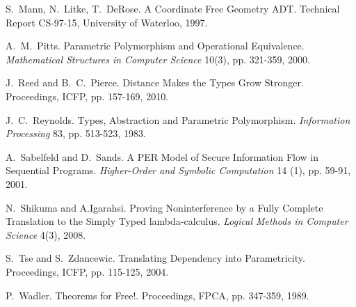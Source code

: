 \documentclass{sigplanconf}
\theoremstyle{examplestyle}
\theoremstyle{restatementstyle}
\begin{document}
\begin{thebibliography}{12}
S.~Mann, N.~Litke, T.~DeRose.  A Coordinate Free Geometry {ADT}.
Technical Report CS-97-15, University of Waterloo, 1997.

A.~M.~Pitts.  Parametric Polymorphism and Operational Equivalence.
{\em Mathematical Structures in Computer Science} 10(3), pp. 321-359,
2000.

J.~Reed and B.~C.~Pierce.  Distance Makes the Types Grow Stronger.
Proceedings, ICFP, pp. 157-169, 2010.

J.~C.~Reynolds. Types, Abstraction and Parametric Polymorphism.
{\em Information Processing} 83, pp. 513-523, 1983.

A.~Sabelfeld and D.~Sands.  A PER Model of Secure Information Flow in
Sequential Programs.  {\em Higher-Order and Symbolic Computation} 14
(1), pp. 59-91, 2001.

N.~Shikuma and A.Igarahsi.  Proving Noninterference by a Fully
Complete Translation to the Simply Typed lambda-calculus.  {\em
    Logical Methods in Computer Science} 4(3), 2008.

S.~Tse and S.~Zdancewic.  Translating Dependency into Parametricity.
Proceedings, ICFP,  pp.
115-125, 2004.

P.~Wadler.  Theorems for Free!.  Proceedings, FPCA,
pp. 347-359, 1989.

\end{thebibliography}
\end{document}
